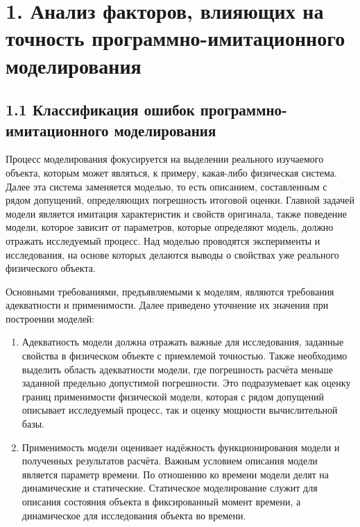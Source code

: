 	
\chapter*{\centering\large{1. Анализ факторов, влияющих на точность программно-имитационного моделирования}}

 
\label{sec:Chapter1} 

\large{\begin{onehalfspace}

		
	\section*{\large{1.1 Классификация ошибок программно-имитационного моделирования}}


   

	Процесс моделирования фокусируется на выделении реального изучаемого объекта, которым может являться, к примеру, какая-либо физическая система. Далее эта система заменяется моделью, то есть описанием, составленным с рядом допущений, определяющих погрешность итоговой оценки. Главной задачей модели является имитация характеристик и свойств оригинала, также поведение модели, которое зависит от параметров, которые определяют модель, должно отражать исследуемый процесс. Над моделью проводятся эксперименты и исследования, на основе которых делаются выводы о свойствах уже реального физического объекта.

   
	Основными требованиями, предъявляемыми к моделям, являются требования адекватности и применимости. Далее приведено уточнение их значения при построении моделей:
	\begin{enumerate}
	\item	Адекватность модели должна отражать важные для исследования, заданные свойства в физическом объекте с приемлемой точностью. Также необходимо выделить область адекватности модели, где погрешность расчёта меньше заданной предельно допустимой погрешности. Это подразумевает как оценку границ применимости физической модели, которая с рядом допущений описывает исследуемый процесс, так и оценку мощности вычислительной базы.
	
	\item	Применимость модели оценивает надёжность функционирования модели и полученных результатов расчёта. Важным условием описания модели является параметр времени. По отношению ко времени модели делят на динамические и статические. Статическое моделирование служит для описания состояния объекта в фиксированный момент времени, а динамическое для исследования объекта во времени.
 

\end{enumerate}
\end{onehalfspace}}
